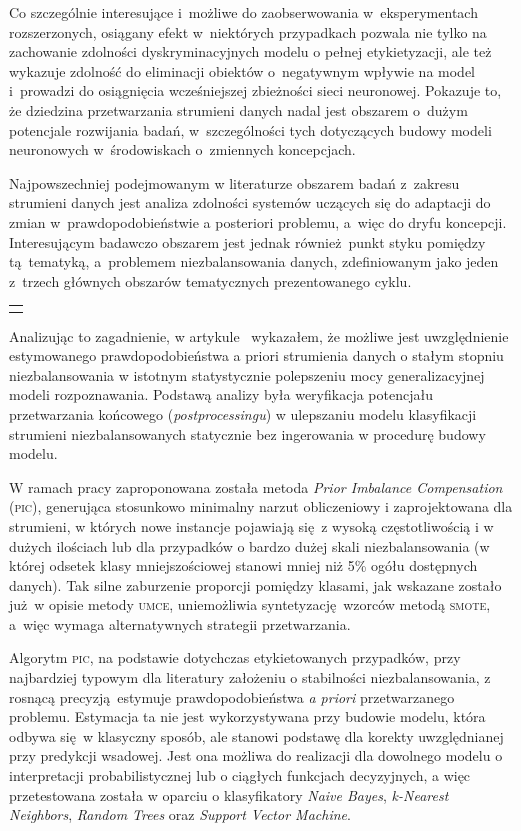 Co szczególnie interesujące i~możliwe do zaobserwowania w~eksperymentach rozszerzonych, osiągany efekt w~niektórych przypadkach pozwala nie tylko na zachowanie zdolności dyskryminacyjnych modelu o pełnej etykietyzacji, ale też wykazuje zdolność do eliminacji obiektów o~negatywnym wpływie na model i~prowadzi do osiągnięcia wcześniejszej zbieżności sieci neuronowej. Pokazuje to, że dziedzina przetwarzania strumieni danych nadal jest obszarem o~dużym potencjale rozwijania badań, w~szczególności tych dotyczących budowy modeli neuronowych w~środowiskach o~zmiennych koncepcjach.

Najpowszechniej podejmowanym w literaturze obszarem badań z~zakresu strumieni danych jest analiza zdolności systemów uczących się do adaptacji do zmian w~prawdopodobieństwie a posteriori problemu, a~więc do dryfu koncepcji. Interesującym badawczo obszarem jest jednak również punkt styku pomiędzy tą tematyką, a~problemem niezbalansowania danych, zdefiniowanym jako jeden z~trzech głównych obszarów tematycznych prezentowanego cyklu.\vspace{1em}

{
\color{red}
\noindent\begin{tabular}{p{\textwidth}}
	\toprule &
\end{tabular}\vspace{-1em}
}
\noindent Analizując to zagadnienie, w artykule~ wykazałem, że możliwe jest uwzględnienie estymowanego prawdopodobieństwa a priori strumienia danych o stałym stopniu niezbalansowania w istotnym statystycznie polepszeniu mocy generalizacyjnej modeli rozpoznawania. Podstawą analizy była weryfikacja potencjału przetwarzania końcowego (\emph{postprocessingu}) w ulepszaniu modelu klasyfikacji strumieni niezbalansowanych statycznie bez ingerowania w procedurę budowy modelu.

W ramach pracy zaproponowana została metoda \emph{Prior Imbalance Compensation} (\textsc{pic}), generująca stosunkowo minimalny narzut obliczeniowy i zaprojektowana dla strumieni, w których nowe instancje pojawiają się z wysoką częstotliwością i w dużych ilościach lub dla przypadków o bardzo dużej skali niezbalansowania (w której odsetek klasy mniejszościowej stanowi mniej niż 5\% ogółu dostępnych danych). Tak silne zaburzenie proporcji pomiędzy klasami, jak wskazane zostało już w opisie metody \textsc{umce}, uniemożliwia syntetyzację wzorców metodą \textsc{smote}, a~więc wymaga alternatywnych strategii przetwarzania.

Algorytm \textsc{pic}, na podstawie dotychczas etykietowanych przypadków, przy najbardziej typowym dla literatury założeniu o stabilności niezbalansowania, z rosnącą precyzją estymuje prawdopodobieństwa \emph{a priori} przetwarzanego problemu. Estymacja ta nie jest wykorzystywana przy budowie modelu, która odbywa się w klasyczny sposób, ale stanowi podstawę dla korekty uwzględnianej przy predykcji wsadowej. Jest ona możliwa do realizacji dla dowolnego modelu o interpretacji probabilistycznej lub o ciągłych funkcjach decyzyjnych, a więc przetestowana została w oparciu o klasyfikatory \emph{Naive Bayes}, \emph{k-Nearest Neighbors}, \emph{Random Trees} oraz \emph{Support Vector Machine}.

